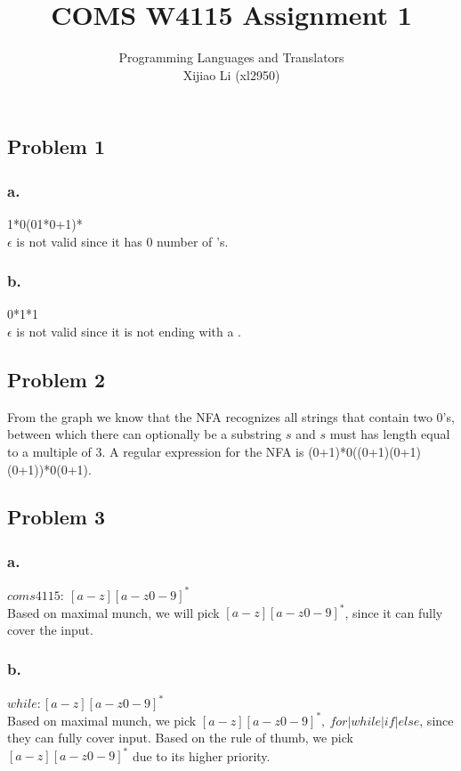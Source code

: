 \documentclass{article}
\title{COMS W4115
	Assignment 1}
\author{Programming Languages and Translators\medskip\\
	Xijiao Li (xl2950)}
\begin{document}
	\maketitle
	
	\newpage
	\subsection*{Problem 1}
	\subsubsection*{a.}
	1*0(01*0+1)*\\
	$\epsilon$ is not valid since it has 0 number of 's.
	\subsubsection*{b.}
	0*1*1\\
	$\epsilon$ is not valid since it is not ending with a .
	
	\subsection*{Problem 2}
	From the graph we know that the NFA recognizes all strings that contain two 0’s, between which there can optionally be a substring $s$ and $s$ must has length equal to a multiple of 3. A regular expression for the NFA is (0+1)*0((0+1)(0+1)(0+1))*0(0+1).
	
	
	\subsection*{Problem 3}
	\subsubsection*{a.}
	$coms4115: \ [a-z][a-z 0-9]^*$\\
	Based on maximal munch, we will pick $[a-z][a-z 0-9]^*$, since it can fully cover the input.
	
	\subsubsection*{b.}
	$while: [a-z][a-z 0-9]^*$\\
	Based on maximal munch, we pick $[a-z][a-z 0-9]^*,\ for|while|if |else$, since they can fully cover input. Based on the rule of thumb, we pick $[a-z][a-z 0-9]^*$ due to its higher priority.
	
\end{document}
